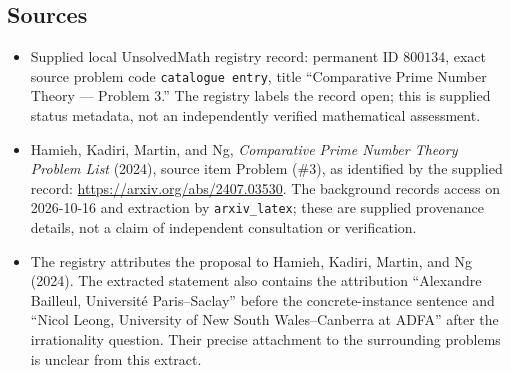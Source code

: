 \documentclass[11pt]{article}
\begin{document}
\subsection{Sources}
\begin{itemize}
\item Supplied local UnsolvedMath registry record: permanent ID \(800134\), exact source problem code \texttt{catalogue entry}, title ``Comparative Prime Number Theory --- Problem 3.'' The registry labels the record open; this is supplied status metadata, not an independently verified mathematical assessment.
\item Hamieh, Kadiri, Martin, and Ng, \emph{Comparative Prime Number Theory Problem List} (2024), source item Problem (\#3), as identified by the supplied record: \url{https://arxiv.org/abs/2407.03530}. The background records access on 2026-10-16 and extraction by \texttt{arxiv\_latex}; these are supplied provenance details, not a claim of independent consultation or verification.
\item The registry attributes the proposal to Hamieh, Kadiri, Martin, and Ng (2024). The extracted statement also contains the attribution ``Alexandre Bailleul, Universit\'e Paris--Saclay'' before the concrete-instance sentence and ``Nicol Leong, University of New South Wales--Canberra at ADFA'' after the irrationality question. Their precise attachment to the surrounding problems is unclear from this extract.
\end{itemize}
\end{document}
